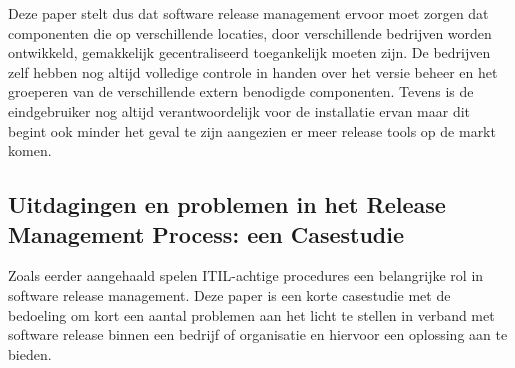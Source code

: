 Deze paper \autocite{Hoek2002} stelt dus dat software release management ervoor moet zorgen dat componenten die op verschillende locaties, door verschillende bedrijven worden ontwikkeld, gemakkelijk gecentraliseerd toegankelijk moeten zijn. De bedrijven zelf hebben nog altijd volledige controle in handen over het versie beheer en het groeperen van de verschillende extern benodigde componenten. Tevens is de eindgebruiker nog altijd verantwoordelijk voor de installatie ervan maar dit begint ook minder het geval te zijn aangezien er meer release tools op de markt komen.

\subsection{Uitdagingen en problemen in het Release Management Process: een Casestudie}
Zoals eerder aangehaald spelen ITIL-achtige procedures een belangrijke rol in software release management. Deze paper \autocite{Lahtela2011} is een korte casestudie met de bedoeling om kort een aantal problemen aan het licht te stellen in verband met software release binnen een bedrijf of organisatie en hiervoor een oplossing aan te bieden.


